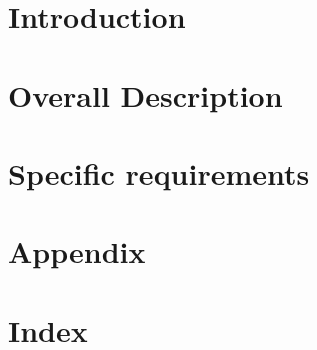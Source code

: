 \documentclass[11pt,a4paper,titlepage]{article}
\begin{document}




\section{Introduction}
\label{intro}



\section{Overall Description}
\label{description}



\section{Specific requirements}
\label{requirements}



\section{Appendix}
\label{appendix}



\section{Index}
\label{index}
\printindex
\end{document}
